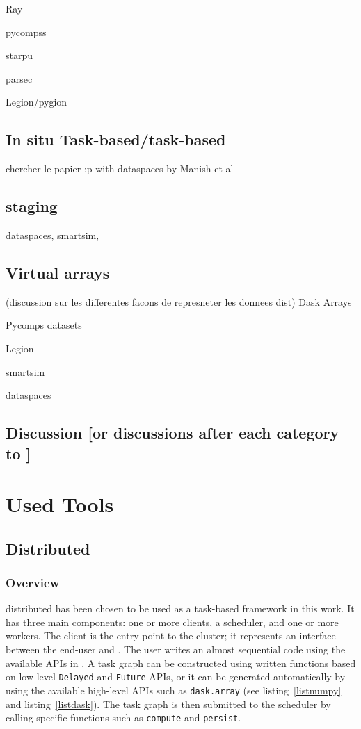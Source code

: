 Ray

pycompss

starpu

parsec

Legion/pygion


\subsection{In situ Task-based/task-based}
chercher le papier :p
with dataspaces by Manish et al
\subsection{staging}
dataspaces, smartsim, 
\subsection{Virtual arrays}
(discussion sur les differentes facons de represneter les donnees dist)
Dask Arrays 

Pycomps datasets 

Legion

smartsim

dataspaces

\subsection{Discussion [or discussions after each category to ]}

\section{Used Tools}




\subsection{\dask Distributed}\label{sec:dask.distributed}
\subsubsection{Overview}
\dask distributed has been chosen to be used as a task-based framework in this work.  
It has three main components: one or more clients, a scheduler, and one or more workers. The client is the entry point to the \dask cluster; it represents an interface between the end-user and \dask. 
The user writes an almost sequential code using the available APIs in \dask. A task graph can be constructed using written functions based on low-level \texttt{Delayed} and \texttt{Future} APIs, or it can be generated automatically by using the available high-level APIs such as \texttt{dask.array} (see listing~\ref{listnumpy} and listing~\ref{listdask}). The task graph is then submitted to the scheduler by calling specific functions such as \texttt{compute} and \texttt{persist}.    

